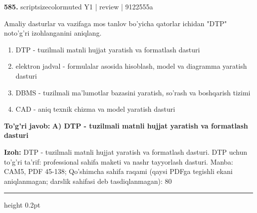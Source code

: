 \documentclass[10pt,a4paper]{article}
\begin{document}
{\bfseries\sffamily\color{ink} 585.} {scriptsizecolor{muted} Y1 | review | 9122555a}
\par
Amaliy dasturlar va vazifaga mos tanlov bo'yicha qatorlar ichidan "DTP" noto'g'ri izohlanganini aniqlang.
\begin{enumerate}[label=\Alph*),leftmargin=9mm]
\item DTP - tuzilmali matnli hujjat yaratish va formatlash dasturi
\item elektron jadval - formulalar asosida hisoblash, model va diagramma yaratish dasturi
\item DBMS - tuzilmali ma'lumotlar bazasini yaratish, so'rash va boshqarish tizimi
\item CAD - aniq texnik chizma va model yaratish dasturi
\end{enumerate}
\begin{tcolorbox}[enhanced,breakable,colback=teal!4,colframe=teal!60!black,boxrule=0.45pt,arc=1.2mm,left=2.7mm,right=2.7mm,top=1.8mm,bottom=1.8mm,before skip=2mm,after skip=2mm]
{\bfseries\sffamily\color{teal}To'g'ri javob:} \textbf{A) DTP - tuzilmali matnli hujjat yaratish va formatlash dasturi}
\par\smallskip
{\bfseries Izoh:} DTP - tuzilmali matnli hujjat yaratish va formatlash dasturi. DTP uchun to'g'ri ta'rif: professional sahifa maketi va nashr tayyorlash dasturi. Manba: CAM5, PDF 45-138; Qo'shimcha sahifa raqami (qaysi PDFga tegishli ekani aniqlanmagan; darslik sahifasi deb tasdiqlanmagan): 80
\end{tcolorbox}
\vspace{2mm}\hrule height 0.2pt\vspace{3mm}
\end{document}
